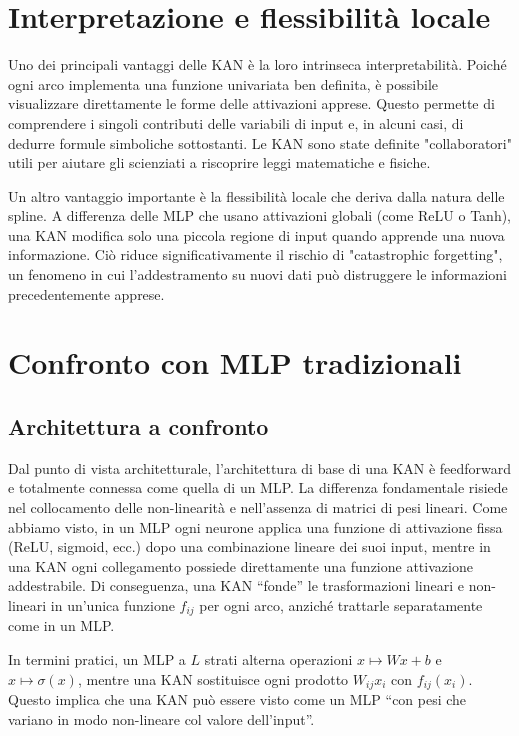 \documentclass[a4paper,12pt]{report}
\begin{document}
	\section{Interpretazione e flessibilità locale}
	Uno dei principali vantaggi delle KAN è la loro intrinseca interpretabilità. Poiché ogni arco implementa una funzione univariata ben definita, è possibile visualizzare direttamente le forme delle attivazioni apprese. Questo permette di comprendere i singoli contributi delle variabili di input e, in alcuni casi, di dedurre formule simboliche sottostanti. Le KAN sono state definite "collaboratori" utili per aiutare gli scienziati a riscoprire leggi matematiche e fisiche.
	
	Un altro vantaggio importante è la flessibilità locale che deriva dalla natura delle spline. A differenza delle MLP che usano attivazioni globali (come ReLU o Tanh), una KAN modifica solo una piccola regione di input quando apprende una nuova informazione. Ciò riduce significativamente il rischio di "catastrophic forgetting", un fenomeno in cui l'addestramento su nuovi dati può distruggere le informazioni precedentemente apprese.
	
	\section{Confronto con MLP tradizionali}
	
	\subsection{Architettura a confronto}
	
	Dal punto di vista architetturale, l’architettura di base di una KAN è feedforward e totalmente connessa come quella di un MLP. La differenza fondamentale risiede nel collocamento delle non-linearità e nell’assenza di matrici di pesi lineari. Come abbiamo visto, in un MLP ogni neurone applica una funzione di attivazione fissa (ReLU, sigmoid, ecc.) dopo una combinazione lineare dei suoi input, mentre in una KAN ogni collegamento possiede direttamente una funzione attivazione addestrabile. Di conseguenza, una KAN “fonde” le trasformazioni lineari e non-lineari in un’unica funzione $f_{ij}$ per ogni arco, anziché trattarle separatamente come in un MLP.
	
	In termini pratici, un MLP a $L$ strati alterna operazioni $x \mapsto W x + b$ e $x \mapsto \sigma(x)$, mentre una KAN sostituisce ogni prodotto $W_{ij}x_i$ con $f_{ij}(x_i)$. Questo implica che una KAN può essere visto come un MLP “con pesi che variano in modo non-lineare col valore dell’input”. 
	
\end{document}
